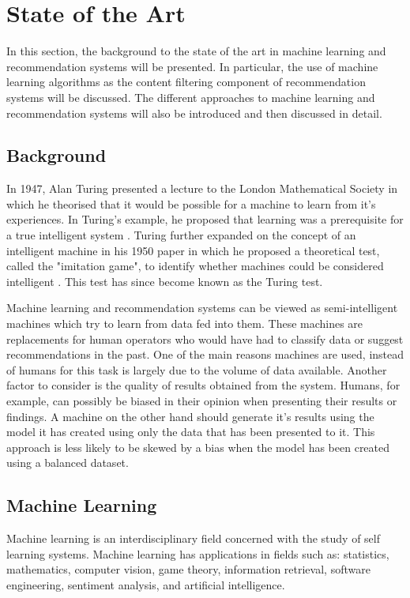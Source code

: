 \chapter{State of the Art}

In this section, the background to the state of the art in machine learning and recommendation systems will be presented.
In particular, the use of machine learning algorithms as the content filtering component of recommendation systems will be discussed.
The different approaches to machine learning and recommendation systems will also be introduced and then discussed in detail.

\section{Background}
In 1947, Alan Turing presented a lecture to the London Mathematical Society in which he theorised that it would be possible for a machine to learn from it's experiences.
In Turing's example, he proposed that learning was a prerequisite for a true intelligent system \cite{Turing1946}.
Turing further expanded on the concept of an intelligent machine in his 1950 paper in which he proposed a theoretical test, called the "imitation game", to identify whether machines could be considered intelligent \cite{Turing1950}.
This test has since become known as the Turing test.

Machine learning and recommendation systems can be viewed as semi-intelligent machines which try to learn from data fed into them\cite{mlTutorial}.
These machines are replacements for human operators who would have had to classify data or suggest recommendations in the past.
One of the main reasons machines are used, instead of humans for this task is largely due to the volume of data available\cite{lops}.
Another factor to consider is the quality of results obtained from the system.
Humans, for example, can possibly be biased in their opinion when presenting their results or findings.
A machine on the other hand should generate it's results using the model it has created using only the data that has been presented to it.
This approach is less likely to be skewed by a bias when the model has been created using a balanced dataset\cite{FProvost2000}.

\section{Machine Learning}
Machine learning is an interdisciplinary field concerned with the study of self learning systems.
Machine learning has applications in fields such as: statistics, mathematics, computer vision, game theory, information retrieval, software engineering, sentiment analysis, and artificial intelligence\cite{mlTutorial}.

